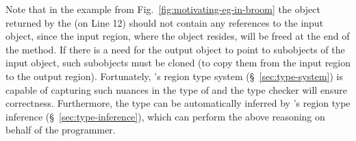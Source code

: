 



 Note that in the example from
Fig.~\ref{fig:motivating-eg-in-broom} the object returned by the
 (on Line 12) should not contain any references to the
input object, since the input region, where the object resides, will
be freed at the end of the method. If there is a need for the output
object to point to subobjects of the input object, such subobjects
must be cloned (to copy them from the input region to the output
region).  Fortunately, \name's region type system
(\S~\ref{sec:type-system}) is capable of capturing such nuances in the
type of  and the type checker will ensure correctness.
Furthermore, the type can be automatically inferred by \name's region
type inference (\S~\ref{sec:type-inference}), which can perform the
above reasoning on behalf of the programmer.


